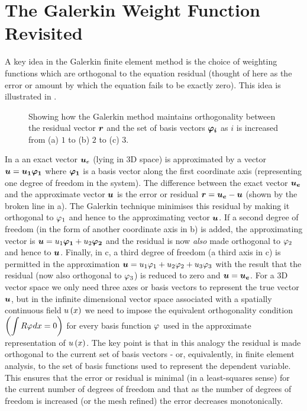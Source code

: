 \section{The Galerkin Weight Function Revisited}

A key idea in the Galerkin finite element method
is the choice of weighting functions which are orthogonal to the equation
residual (thought of here as the error or amount by which the equation fails
to be exactly zero).  This idea is illustrated in .
\begin{figure} \centering
  
  \caption{Showing how the Galerkin method maintains orthogonality between the 
    residual vector $\vect{R}$ and the set of basis vectors
    $\vect{\lbfnsymb{i}}$ as
    $i$ is increased from (a) $1$ to (b) $2$ to (c) $3$.}
  \label{fig:galerkin}
\end{figure}

In a an exact vector $\vect{u}_{e}$ (lying in 3D space)
is approximated by a vector $\vect{u}=\vect{u_{1}\lbfnsymb{1}}$ where
$\vect{\lbfnsymb{1}}$ is a basis vector along the first coordinate axis
(representing one degree of freedom in the system). The difference between the
exact vector $\vect{u_{e}}$ and the approximate vector $\vect{u}$ is the error
or residual $\vect{R}=\vect{u_{e}}-\vect{u}$ (shown by the broken line in
a).  The Galerkin technique minimises this residual by
making it orthogonal to $ \varphi_{1} $ and hence to the approximating vector
$\vect{u}$.  If a second degree of freedom (in the form of another coordinate
axis in b) is added, the approximating vector is
$\vect{u}=u_{1}\vect{\lbfnsymb{1}}+u_{2}\vect{\lbfnsymb{2}}$ and the residual
is now \emph{also} made orthogonal to $ \varphi_{2} $ and hence to $\vect{u}$.
Finally, in c, a third degree of freedom (a third axis in
c) is permitted in the approximation
$\vect{u}=u_{1}\lbfnsymb{1}+u_{2}\lbfnsymb{2}+u_{3}\lbfnsymb{3}$ with the
result that the residual (now also orthogonal to $ \varphi_{3} $) is reduced to
zero and $\vect{u}=\vect{u_{e}}$. For a 3D vector space we only need three
axes or basis vectors to represent the true vector $\vect{u}$, but in the
infinite dimensional vector space associated with a spatially continuous field
$ u\left( x \right) $ we need to impose the equivalent orthogonality condition
$\left( \displaystyle\int R \varphi_{}  dx = 0 \right)$ for every basis function $ \varphi_{} $ used in
the approximate representation of $ u\left( x \right) $. The key point is that in this
analogy the residual is made orthogonal to the current set of basis vectors -
or, equivalently, in finite element analysis, to the set of basis functions
used to represent the dependent variable. This ensures that the error or
residual is minimal (in a least-squares sense) for the current number of
degrees of freedom and that as the number of degrees of freedom is increased
(or the mesh refined) the error decreases monotonically.


